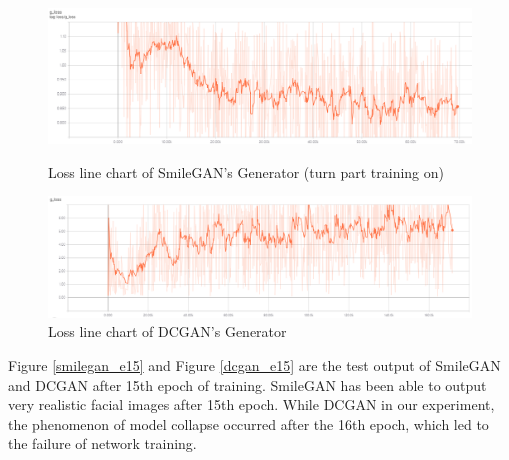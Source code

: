 \begin{figure}
    \begin{minipage}[t]{0.49\linewidth}
        \centering
        \includegraphics[width=\textwidth]{figures/loss_part_on_g.png}
        \caption{Loss line chart of SmileGAN's Generator (turn part training on)}
        \label{loss_part_on_g}
    \end{minipage}
        \hfill
    \begin{minipage}[t]{0.49\linewidth}
        \centering
        \includegraphics[width=\textwidth]{figures/loss_dcgan_g.png}
        \caption{Loss line chart of DCGAN's Generator}
        \label{loss_dcgan_g}
    \end{minipage}
\end{figure}

Figure \ref{smilegan_e15} and Figure \ref{dcgan_e15} are the test output of SmileGAN and DCGAN after 15th epoch of training.
SmileGAN has been able to output very realistic facial images after 15th epoch.
While DCGAN in our experiment, the phenomenon of model collapse occurred after the 16th epoch, which led to the failure of network training.

